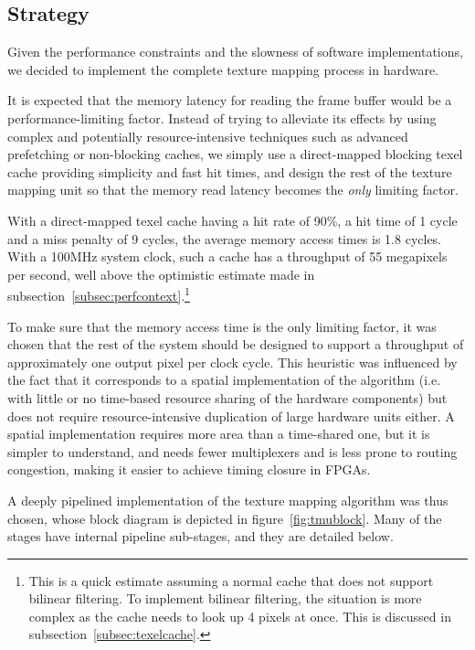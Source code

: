 \documentclass[a4paper,11pt]{kthesis}
\begin{document}
\subsection{Strategy}
\label{subsec:tmustrategy}
Given the performance constraints and the slowness of software implementations, we decided to implement the complete texture mapping process in hardware.

It is expected that the memory latency for reading the frame buffer would be a performance-limiting factor. Instead of trying to alleviate its effects by using complex and potentially resource-intensive techniques such as advanced prefetching or non-blocking caches, we simply use a direct-mapped blocking texel cache providing simplicity and fast hit times, and design the rest of the texture mapping unit so that the memory read latency becomes the \textit{only} limiting factor.

With a direct-mapped texel cache having a hit rate of 90\%, a hit time of 1 cycle and a miss penalty of 9 cycles, the average memory access times is 1.8 cycles. With a 100MHz system clock, such a cache has a throughput of 55 megapixels per second, well above the optimistic estimate made in subsection~\ref{subsec:perfcontext}.\footnote{This is a quick estimate assuming a normal cache that does not support bilinear filtering. To implement bilinear filtering, the situation is more complex as the cache needs to look up 4 pixels at once. This is discussed in subsection~\ref{subsec:texelcache}.}

To make sure that the memory access time is the only limiting factor, it was chosen that the rest of the system should be designed to support a throughput of approximately one output pixel per clock cycle. This heuristic was influenced by the fact that it corresponds to a spatial implementation of the algorithm (i.e. with little or no time-based resource sharing of the hardware components) but does not require resource-intensive duplication of large hardware units either. A spatial implementation requires more area than a time-shared one, but it is simpler to understand, and needs fewer multiplexers and is less prone to routing congestion, making it easier to achieve timing closure in FPGAs.

A deeply pipelined implementation of the texture mapping algorithm was thus chosen, whose block diagram is depicted in figure~\ref{fig:tmublock}. Many of the stages have internal pipeline sub-stages, and they are detailed below.
\end{document}
